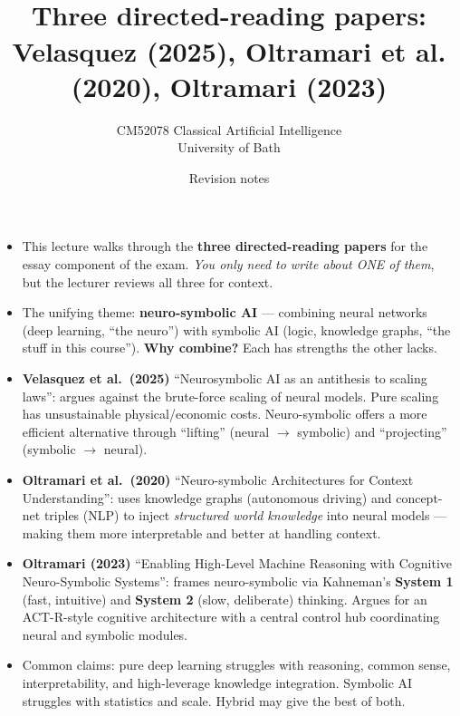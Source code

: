 \documentclass[11pt, a4paper]{article}
\title{\vspace{-1cm}{\Huge\bfseries Week 11 — Neuro-Symbolic AI: Essay Walkthrough} \\[0.4em]{\large Three directed-reading papers: Velasquez (2025), Oltramari et al. (2020), Oltramari (2023)}}
\author{\large CM52078 Classical Artificial Intelligence \\[0.2em]\normalsize University of Bath}
\date{Revision notes}
\begin{document}
\maketitle
\thispagestyle{empty}

\vspace{1em}

\begin{tldrbox}
\begin{itemize}[leftmargin=*]
  \item This lecture walks through the \textbf{three directed-reading papers} for the essay component of the exam. \emph{You only need to write about ONE of them}, but the lecturer reviews all three for context.
  \item The unifying theme: \textbf{neuro-symbolic AI} — combining neural networks (deep learning, ``the neuro'') with symbolic AI (logic, knowledge graphs, ``the stuff in this course''). \textbf{Why combine?} Each has strengths the other lacks.
  \item \textbf{Velasquez et al.\ (2025)} ``Neurosymbolic AI as an antithesis to scaling laws'': argues against the brute-force scaling of neural models. Pure scaling has unsustainable physical/economic costs. Neuro-symbolic offers a more efficient alternative through ``lifting'' (neural $\to$ symbolic) and ``projecting'' (symbolic $\to$ neural).
  \item \textbf{Oltramari et al.\ (2020)} ``Neuro-symbolic Architectures for Context Understanding'': uses knowledge graphs (autonomous driving) and concept-net triples (NLP) to inject \emph{structured world knowledge} into neural models — making them more interpretable and better at handling context.
  \item \textbf{Oltramari (2023)} ``Enabling High-Level Machine Reasoning with Cognitive Neuro-Symbolic Systems'': frames neuro-symbolic via Kahneman's \textbf{System 1} (fast, intuitive) and \textbf{System 2} (slow, deliberate) thinking. Argues for an ACT-R-style cognitive architecture with a central control hub coordinating neural and symbolic modules.
  \item Common claims: pure deep learning struggles with reasoning, common sense, interpretability, and high-leverage knowledge integration. Symbolic AI struggles with statistics and scale. Hybrid may give the best of both.
\end{itemize}
\end{tldrbox}

\end{document}
